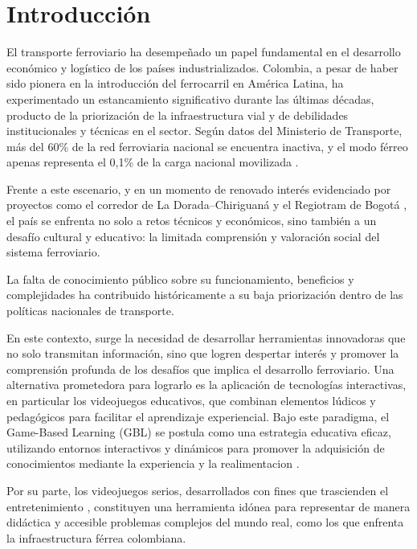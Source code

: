 
\chapter{Introducción}

El transporte ferroviario ha desempeñado un papel fundamental en el desarrollo económico y logístico de los países industrializados. Colombia, a pesar de haber sido pionera en la introducción del ferrocarril en América Latina, ha experimentado un estancamiento significativo durante las últimas décadas, producto de la priorización de la infraestructura vial y de debilidades institucionales y técnicas en el sector. Según datos del Ministerio de Transporte, más del 60\% de la red ferroviaria nacional se encuentra inactiva, y el modo férreo apenas representa el 0,1\% de la carga nacional movilizada\autocite{mintransporteDatosCarga} .

Frente a este escenario, y en un momento de renovado interés evidenciado por proyectos como el corredor de La Dorada–Chiriguaná \autocite{mintransporteAPP2025} y el Regiotram de Bogotá \autocite{bogotaRegiotram2025} , el país se enfrenta no solo a retos técnicos y económicos, sino también a un desafío cultural y educativo: la limitada comprensión y valoración social del sistema ferroviario. 

La falta de conocimiento público sobre su funcionamiento, beneficios y complejidades ha contribuido históricamente a su baja priorización dentro de las políticas nacionales de transporte.

En este contexto, surge la necesidad de desarrollar herramientas innovadoras que no solo transmitan información, sino que logren despertar interés y promover la comprensión profunda de los desafíos que implica el desarrollo ferroviario. Una alternativa prometedora para lograrlo es la aplicación de tecnologías interactivas, en particular los videojuegos educativos, que combinan elementos lúdicos y pedagógicos para facilitar el aprendizaje experiencial. Bajo este paradigma, el Game-Based Learning (GBL) se postula como una estrategia educativa eficaz, utilizando entornos interactivos y dinámicos para promover la adquisición de conocimientos mediante la experiencia y la realimentacion \autocite{gblFrameworkExamining} .

Por su parte, los videojuegos serios, desarrollados con fines que trascienden el entretenimiento \autocite{seriousGamesMechanisms} , constituyen una herramienta idónea para representar de manera didáctica y accesible problemas complejos del mundo real, como los que enfrenta la infraestructura férrea colombiana.

